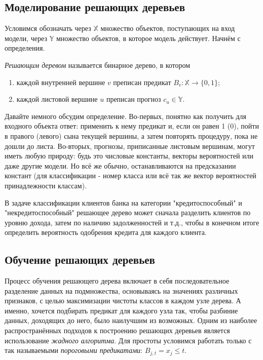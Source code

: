 \subsection{Моделирование решающих деревьев}
Условимся обозначать через $\mathbb{X}$ множество объектов, поступающих на вход модели, через $\mathbb{Y}$ множество объектов, в которое модель действует. Начнём с определения.
\begin{definition}
    \textit{Решающим деревом} называется бинарное дерево, в котором
    \begin{enumerate}
        \item каждой внутренней вершине $v$ преписан предикат $B_v: \mathbb{X} \to \{0, 1\}$;
        \item каждой листовой вершине $u$ преписан прогноз $c_u \in \mathbb{Y}$.
    \end{enumerate}
\end{definition}

Давайте немного обсудим определение. Во-первых, понятно как получить для входного объекта ответ: применить к нему предикат и, если он равен 1 (0), пойти в правого (левого) сына текущей вершины, а затем повторять процедуру, пока не дошли до листа. Во-вторых, прогнозы, приписанные листовым вершинам, могут иметь любую природу: будь это числовые константы, векторы вероятностей или даже другие модели. Но всё же обычно, останавливаются на предсказании констант (для классификации - номер класса или всё так же вектор вероятностей принадлежности классам).

\begin{example}
    В задаче классификации клиентов банка на категории "кредитоспособный" и "некредитоспособный" решающее дерево может сначала разделить клиентов по уровню дохода, затем по наличию задолженностей и т.д., чтобы в конечном итоге определить вероятность одобрения кредита для каждого клиента.
\end{example}

\subsection{Обучение решающих деревьев}
Процесс обучения решающего дерева включает в себя последовательное разделение данных на подмножества, основываясь на значениях различных признаков, с целью максимизации чистоты классов в каждом узле дерева. А именно, хочется подбирать предикат для каждого узла так, чтобы разбиние данных, доходящих до него, было наилучшим из возможных. Одним из наиболее распространённых подходов к построению решающих деревьев является использование \textit{жадного алгоритма}. Для простоты условимся работать только с так называемыми \textit{пороговыми предикатами}: $B_{j, t} = x_j \leq t$.

